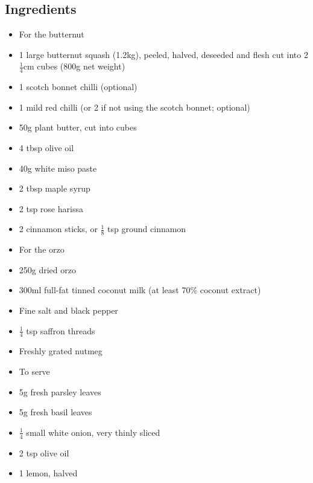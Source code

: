 \documentclass{book}
\begin{document}
\subsection*{Ingredients}
\begin{itemize}
\item For the butternut
\item 1 large butternut squash (1.2kg), peeled, halved, deseeded and flesh cut into 2$\frac{1}{4}$cm cubes (800g net weight)
\item 1 scotch bonnet chilli (optional)
\item 1 mild red chilli (or 2 if not using the scotch bonnet; optional)
\item 50g plant butter, cut into cubes
\item 4 tbsp olive oil
\item 40g white miso paste 
\item 2 tbsp maple syrup
\item 2 tsp rose harissa 
\item 2 cinnamon sticks, or $\frac{1}{8}$ tsp ground cinnamon
\end{itemize}

\begin{itemize}
\item For the orzo
\item 250g dried orzo
\item 300ml full-fat tinned coconut milk (at least 70\% coconut extract)
\item Fine salt and black pepper
\item $\frac{1}{4}$ tsp saffron threads
\item Freshly grated nutmeg
\end{itemize}

\begin{itemize}
\item To serve
\item 5g fresh parsley leaves
\item 5g fresh basil leaves
\item $\frac{1}{4}$ small white onion, very thinly sliced
\item 2 tsp olive oil
\item 1 lemon, halved
\end{itemize}
\end{document}
